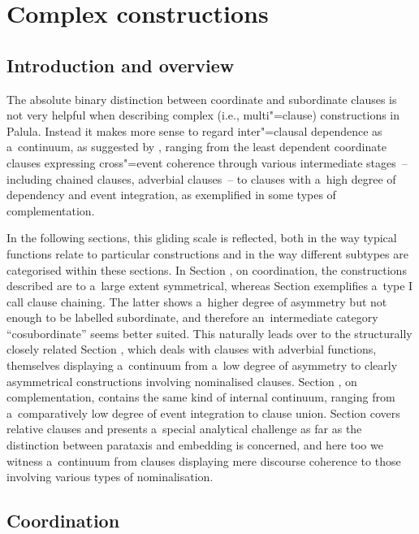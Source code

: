\chapter{Complex constructions}
\label{chap:13}

\section{Introduction and overview}
\label{sec:13-1}


The absolute binary distinction between coordinate and subordinate clauses is not very helpful when describing complex (i.e., multi"=clause) constructions in Palula. Instead it makes more sense to regard inter"=clausal dependence as a~continuum, as suggested by \citet[327--328]{givon2001b}, ranging from the least dependent coordinate clauses expressing cross"=event coherence through various intermediate stages~-- including chained clauses, adverbial clauses~-- to clauses with a~high degree of dependency and event integration, as exemplified in some types of complementation.



In the following sections, this gliding scale is reflected, both in the way typical functions relate to particular constructions and in the way different subtypes are categorised within these sections. In Section , on coordination, the constructions described are to a~large extent symmetrical, whereas Section  exemplifies a~type I call clause chaining. The latter shows a~higher degree of asymmetry but not enough to be labelled subordinate, and therefore an~intermediate category ``cosubordinate'' seems better suited. This naturally leads over to the structurally closely related Section , which deals with clauses with adverbial functions, themselves displaying a~continuum from a~low degree of asymmetry to clearly asymmetrical constructions involving nominalised clauses. Section , on complementation, contains the same kind of internal continuum, ranging from a~comparatively low degree of event integration to clause union. Section  covers relative clauses and presents a~special analytical challenge as far as the distinction between parataxis and embedding is concerned, and here too we witness a~continuum from clauses displaying mere discourse coherence to those involving various types of nominalisation.


\section{Coordination}
\label{sec:13-2}

